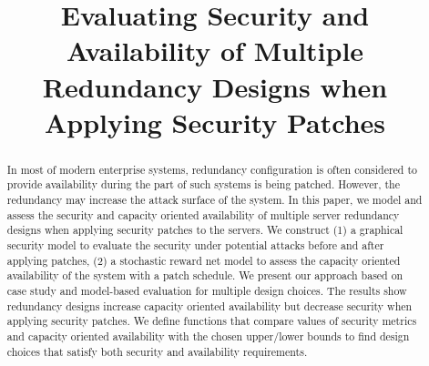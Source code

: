 \documentclass[conference]{IEEEtran}
\begin{document}
%
\title{Evaluating Security and Availability of Multiple Redundancy Designs when Applying Security Patches}

\author{
\and
{}
\and
{}
}

\maketitle

\begin{abstract}
In most of modern enterprise systems, redundancy configuration is often considered to provide availability during the part of such systems is being patched. However, the redundancy may increase the attack surface of the system. In this paper, we model and assess the security and capacity oriented availability of multiple server redundancy designs when applying security patches to the servers. We construct (1) a graphical security model to evaluate the security under potential attacks before and after applying patches, (2) a stochastic reward net model to assess the capacity oriented availability of the system with a patch schedule. We present our approach based on case study and model-based evaluation for multiple design choices. The results show redundancy designs increase capacity oriented availability but decrease security when applying security patches. We define functions that compare values of security metrics and capacity oriented availability with the chosen upper/lower bounds to find design choices that satisfy both security and availability requirements.
\end{abstract}

\IEEEpeerreviewmaketitle
\end{document}
